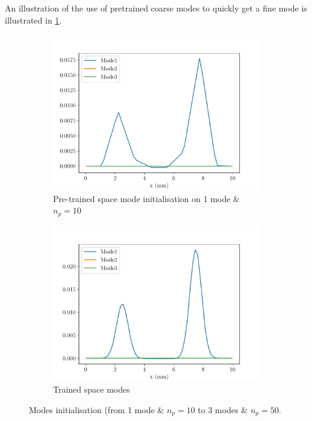 An illustration of the use of pretrained coarse modes to quickly get a fine mode is illustrated in \cref{fig:InitialisationModes_Coarse}.

\begin{figure}
    \begin{subfigure}[t]{0.5\linewidth}
        \centering
        \includegraphics[width=\linewidth]{Figures/Pre_trained_Space_modes3.pdf}
        \caption{Pre-trained space mode initialisation on $1$ mode \& $n_p=10$}
    \end{subfigure}
    \begin{subfigure}[t]{0.5\linewidth}
        \centering
        \includegraphics[width=\linewidth]{Figures/Trained_Space_modes3.pdf}
        \caption{Trained space modes}
    \end{subfigure}
    \caption{Modes initialisation (from 1 mode \& $n_p=10$ to $3$ modes \& $n_p=50$.}
    \label{fig:InitialisationModes_Coarse}
\end{figure}

